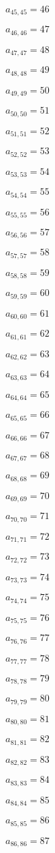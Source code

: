 \documentclass[a4paper,12pt]{article}
\begin{document}
$a _{ 45, 45 } = 46$

$a _{ 46, 46 } = 47$

$a _{ 47, 47 } = 48$

$a _{ 48, 48 } = 49$

$a _{ 49, 49 } = 50$

$a _{ 50, 50 } = 51$

$a _{ 51, 51 } = 52$

$a _{ 52, 52 } = 53$

$a _{ 53, 53 } = 54$

$a _{ 54, 54 } = 55$

$a _{ 55, 55 } = 56$

$a _{ 56, 56 } = 57$

$a _{ 57, 57 } = 58$

$a _{ 58, 58 } = 59$

$a _{ 59, 59 } = 60$

$a _{ 60, 60 } = 61$

$a _{ 61, 61 } = 62$

$a _{ 62, 62 } = 63$

$a _{ 63, 63 } = 64$

$a _{ 64, 64 } = 65$

$a _{ 65, 65 } = 66$

$a _{ 66, 66 } = 67$

$a _{ 67, 67 } = 68$

$a _{ 68, 68 } = 69$

$a _{ 69, 69 } = 70$

$a _{ 70, 70 } = 71$

$a _{ 71, 71 } = 72$

$a _{ 72, 72 } = 73$

$a _{ 73, 73 } = 74$

$a _{ 74, 74 } = 75$

$a _{ 75, 75 } = 76$

$a _{ 76, 76 } = 77$

$a _{ 77, 77 } = 78$

$a _{ 78, 78 } = 79$

$a _{ 79, 79 } = 80$

$a _{ 80, 80 } = 81$

$a _{ 81, 81 } = 82$

$a _{ 82, 82 } = 83$

$a _{ 83, 83 } = 84$

$a _{ 84, 84 } = 85$

$a _{ 85, 85 } = 86$

$a _{ 86, 86 } = 87$
\end{document}
